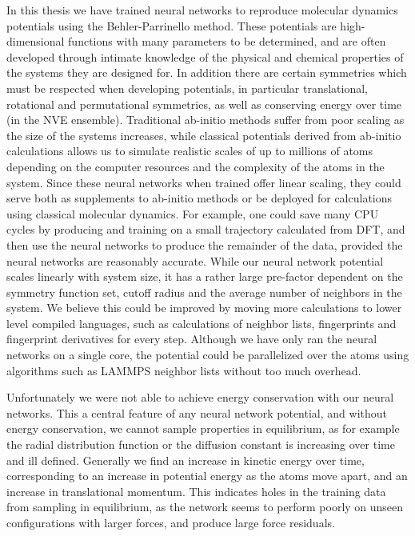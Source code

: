 In this thesis we have trained neural networks to reproduce
molecular dynamics potentials using the Behler-Parrinello method.
These potentials are high-dimensional functions with many parameters
to be determined, and are often developed through intimate knowledge
of the physical and chemical properties of the systems they are designed for.
In addition there are certain symmetries which must be respected when
developing potentials, in particular translational, rotational and permutational
symmetries, as well as conserving energy over time (in the NVE ensemble).
Traditional ab-initio methods suffer from poor scaling as the size of the systems
increases, while classical potentials derived from ab-initio calculations
allows us to simulate realistic scales of up to millions of atoms
depending on the computer resources and the complexity of the atoms in the system.
Since these neural networks when trained offer linear scaling,
they could serve both as supplements to ab-initio methods
or be deployed for calculations using classical molecular dynamics.
For example, one could save many CPU cycles by producing and training
on a small trajectory calculated from DFT, and then use the neural networks
to produce the remainder of the data, provided the neural networks
are reasonably accurate.
While our neural network potential scales linearly with system size,
it has a rather large pre-factor dependent on the symmetry function set,
cutoff radius and the average number of neighbors in the system.
We believe this could be improved by moving more calculations to lower
level compiled languages, such as calculations of neighbor lists,
fingerprints and fingerprint derivatives for every step.
Although we have only ran the neural networks on a single core,
the potential could be parallelized over the atoms
using algorithms such as LAMMPS neighbor lists without
too much overhead.
\par
Unfortunately we were not able to achieve energy conservation
with our neural networks. 
This a central feature of any neural network potential,
and without energy conservation, we cannot sample properties in equilibrium,
as for example the radial distribution function or the diffusion constant
is increasing over time and ill defined.
Generally we find an increase in kinetic energy over time, corresponding
to an increase in potential energy as the atoms move apart,
and an increase in translational momentum.
This indicates holes in the training data from sampling in equilibrium,
as the network seems to perform poorly on unseen configurations with larger
forces, and produce large force residuals.
